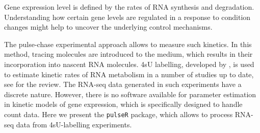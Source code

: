 Gene expression level is defined by the rates of RNA synthesis and degradation.
Understanding how certain gene levels are regulated in a response to
 condition changes might help to uncover the underlying control mechanisms.
\par
The pulse-chase experimental approach allows to measure such kinetics. 
 In this method, tracing molecules are introduced to the medium, 
 which results in their incorporation into nascent RNA molecules.
4sU labelling, developed by \citep{dolken2008high}, is used to estimate 
kinetic rates of RNA metabolism in a number of studies up to date, 
see \citep{wachutka2016measures} for the review.
The  RNA-seq data generated in such experiments  have a discrete nature.
However, there is no software available for  parameter
estimation in kinetic models of gene expression, which is specifically designed to handle 
count data. Here we present the \verb|pulseR| package, which allows to 
process RNA-seq data from 4sU-labelling experiments.
